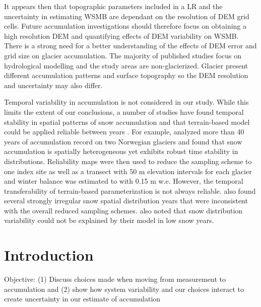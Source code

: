 \documentclass[twocolumn,letterpaper]{igs}
\begin{document}
It appears then that topographic parameters included in a LR and the uncertainty in estimating WSMB are dependant on the resolution of DEM grid cells. Future accumulation investigations should therefore focus on obtaining a high resolution DEM and quantifying effects of DEM variability on WSMB. There is a strong need for a better understanding of the effects of DEM error and grid size on glacier accumulation. The majority of published studies focus on hydrological modelling and the study areas are non-glacierized. Glacier present different accumulation patterns and surface topography so the DEM resolution and uncertainty may also differ.

Temporal variability in accumulation is not considered in our study. While this limits the extent of our conclusions, a number of studies have found temporal stability in spatial patterns of snow accumulation and that terrain-based model could be applied reliable between years \citep[e.g.][]{Grunewald2013}. For example, \cite{Walmsley2015} analyzed more than 40 years of accumulation record on two Norwegian glaciers and found that snow accumulation is spatially heterogeneous yet exhibits robust time stability in distributions. Reliability maps were then used to reduce the sampling scheme to one index site as well as a transect with 50 m elevation intervals for each glacier and winter balance was estimated to with 0.15 m w.e. However, the temporal transferability of terrain-based parameterization is not always reliable. \cite{Walmsley2015} also found several strongly irregular snow spatial distribution years that were inconsistent with the overall reduced sampling schemes.\cite{Revuelto2014} also noted that snow distribution variability could not be explained by their model in low snow years.

\section{Introduction}

Objective: (1) Discuss choices made when moving from measurement to accumulation and (2) show how system variability and our choices interact to create uncertainty in our estimate of accumulation
\end{document}
